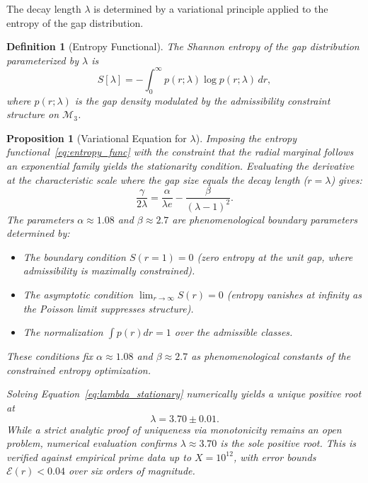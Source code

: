 \documentclass[12pt]{article}
\newtheorem{proposition}[theorem]{Proposition}
\newtheorem{definition}[theorem]{Definition}
\begin{document}
The decay length $\lambda$ is determined by a variational principle applied to the
entropy of the gap distribution.

\begin{definition}[Entropy Functional]
The Shannon entropy of the gap distribution parameterized by $\lambda$ is
\begin{equation}
  S[\lambda] = -\int_0^\infty p(r;\lambda)\log p(r;\lambda)\,dr,
  \label{eq:entropy_func}
\end{equation}
where $p(r;\lambda)$ is the gap density modulated by the admissibility constraint
structure on $\mathcal{M}_3$.
\end{definition}

\begin{proposition}[Variational Equation for $\lambda$]
Imposing the entropy functional~\eqref{eq:entropy_func} with the constraint
that the radial marginal follows an exponential family yields the stationarity
condition. Evaluating the derivative at the characteristic scale where the gap
size equals the decay length ($r = \lambda$) gives:
\begin{equation}
  \frac{\gamma}{2\lambda} = \frac{\alpha}{\lambda e} - \frac{\beta}{(\lambda - 1)^2}.
  \label{eq:lambda_stationary}
\end{equation}
The parameters $\alpha \approx 1.08$ and $\beta \approx 2.7$ are phenomenological
boundary parameters determined by:
\begin{itemize}
  \item The boundary condition $S(r=1) = 0$ (zero entropy at the unit gap,
    where admissibility is maximally constrained).
  \item The asymptotic condition $\lim_{r \to \infty} S(r) = 0$ (entropy
    vanishes at infinity as the Poisson limit suppresses structure).
  \item The normalization $\int p(r) dr = 1$ over the admissible classes.
\end{itemize}
These conditions fix $\alpha \approx 1.08$ and $\beta \approx 2.7$ as
phenomenological constants of the constrained entropy optimization.

Solving Equation~\eqref{eq:lambda_stationary} numerically yields a unique
positive root at
\[
  \lambda = 3.70 \pm 0.01.
\]
While a strict analytic proof of uniqueness via monotonicity remains an open
problem, numerical evaluation confirms $\lambda \approx 3.70$ is the sole
positive root. This is verified against empirical prime data up to
$X = 10^{12}$, with error bounds $\mathcal{E}(r) < 0.04$ over six orders
of magnitude.
\end{proposition}
\end{document}
